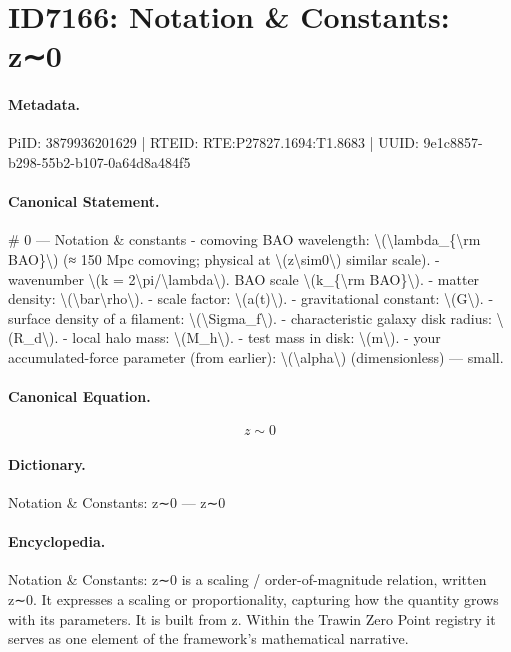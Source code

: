 \section*{ID7166: Notation \& Constants: z∼0}
\paragraph{Metadata.}
PiID: 3879936201629 | RTEID: RTE:P27827.1694:T1.8683 | UUID: 9e1c8857-b298-55b2-b107-0a64d8a484f5

\paragraph{Canonical Statement.}
\# 0 — Notation \& constants - comoving BAO wavelength: \textbackslash{}(\textbackslash{}lambda\_\{\textbackslash{}rm BAO\}\textbackslash{}) (≈ 150 Mpc comoving; physical at \textbackslash{}(z\textbackslash{}sim0\textbackslash{}) similar scale). - wavenumber \textbackslash{}(k = 2\textbackslash{}pi/\textbackslash{}lambda\textbackslash{}). BAO scale \textbackslash{}(k\_\{\textbackslash{}rm BAO\}\textbackslash{}). - matter density: \textbackslash{}(\textbackslash{}bar\textbackslash{}rho\textbackslash{}). - scale factor: \textbackslash{}(a(t)\textbackslash{}). - gravitational constant: \textbackslash{}(G\textbackslash{}). - surface density of a filament: \textbackslash{}(\textbackslash{}Sigma\_f\textbackslash{}). - characteristic galaxy disk radius: \textbackslash{}(R\_d\textbackslash{}). - local halo mass: \textbackslash{}(M\_h\textbackslash{}). - test mass in disk: \textbackslash{}(m\textbackslash{}). - your accumulated-force parameter (from earlier): \textbackslash{}(\textbackslash{}alpha\textbackslash{}) (dimensionless) — small.

\paragraph{Canonical Equation.}
\[
z\sim0
\]

\paragraph{Dictionary.}
Notation \& Constants: z∼0 — z∼0

\paragraph{Encyclopedia.}
Notation \& Constants: z∼0 is a scaling / order-of-magnitude relation, written z∼0. It expresses a scaling or proportionality, capturing how the quantity grows with its parameters. It is built from z. Within the Trawin Zero Point registry it serves as one element of the framework's mathematical narrative.
